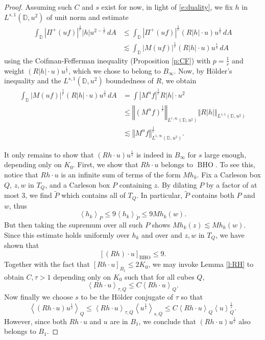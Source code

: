 \documentclass{amsart}
\newcommand{\abs}[1]{\left\vert {#1}\right\vert}
\newcommand{\norm}[1]{\left\Vert {#1}\right\Vert}
\newcommand{\avg}[1]{\left\langle {#1}\right\rangle}
\theoremstyle{definition}
\numberwithin{equation}{section}
\DeclareMathOperator{\BHO}{BHO}
\begin{document}
\begin{proof}
Assuming such $C$ and $s$ exist for now, in light of \eqref{e:duality}, we fix $h$ in $L^{s,1}(\mathbb{D},u^2)$ of unit norm and estimate
    \[ \begin{aligned} \int_{\mathbb{D}} \abs{\Pi^+ (uf)}^{\frac 1r} \abs{h} u^{2- \frac 1r} \, dA &\le \int_{\mathbb{D}} \abs{\Pi^+ (uf)}^{\frac 1r} (R\abs{h} \cdot u) u^{\frac 1s} \, dA \\
    &\lesssim \int_{\mathbb{D}} \abs{M (uf)}^{\frac 1r} (R\abs{h} \cdot u)u^{\frac 1s} \, dA \end{aligned} \]
using the Coifman-Fefferman inequality (Proposition \ref{p:CF}) with $p= \frac 1r$ and weight $(R\abs{h} \cdot u) u^{\frac 1s}$, which we chose to belong to $B_\infty$. Now, by H\"older's inequality and the $L^{s,1}(\mathbb{D},u^2)$ boundedness of $R$, we obtain
    \[\begin{aligned} \int_{\mathbb{D}} \abs{M(u f)}^{\frac 1r} (R\abs{h} \cdot u) u^{\frac 1s} \, dA &= \int \abs{M^u f}^{\frac 1r} R\abs{h} \cdot u^2 \\
        &\le \norm{\left(M^u f\right)^{\frac 1r}}_{L^{r,\infty}(\mathbb{D},u^2)} \norm{R \abs h}_{L^{s,1}(\mathbb{D},u^2)} \\
        &\lesssim \norm{M^u f}_{L^{1,\infty}(\mathbb{D},u^2)}^{\frac 1r}.  \end{aligned} \]


It only remains to show that $(Rh \cdot u)u^{\frac 1s}$ is indeed in $B_\infty$ for $s$ large enough, depending only on $K_0$. First, we show that $Rh \cdot u$ belongs to $\BHO$. 
To see this, notice that $Rh \cdot u$ is an infinite sum of terms of the form $Mh_k$. Fix a Carleson box $Q$, $z,w$ in $T_Q$, and a Carleson box $P$ containing $z$. By dilating $P$ by a factor of at most $3$, we find $\tilde P$ which contains all of $T_Q$. In particular, $\tilde P$ contains both $P$ and $w$, thus
    \[ \avg{ h_k }_{P} \le 9 \avg{h_k}_{\tilde P} \le  9 Mh_k(w).\]
But then taking the supremum over all such $P$ shows $Mh_k(z) \lesssim Mh_k(w)$. Since this estimate holds uniformly over $h_k$ and over and $z,w$ in $T_Q$, we have shown that	
	\[ [ (Rh) \cdot u] _{\BHO} \le 9.\] 
Together with the fact that $[Rh \cdot u]_{B_1} \le 2K_0$, we may invoke Lemma \ref{l:RH} to obtain $C,\tau>1$ depending only on $K_0$ such that for all cubes $Q$,
    \[ \avg{Rh \cdot u}_{\tau,Q} \le C \avg{Rh \cdot u}_Q.\]
Now finally we choose $s$ to be the H\"older conjugate of $\tau$ so that
    \[ \avg{(Rh \cdot u) u^{\frac 1s} }_{Q} \le \avg{Rh \cdot u }_{\tau, Q}\avg{ u^{\frac 1s} }_{s, Q} \le C \avg{ Rh \cdot u}_Q \avg{u}_Q^{\frac 1 {s}}.\]
However, since both $Rh \cdot u$ and $u$ are in $B_1$, we conclude that $(Rh \cdot u)u^{\frac 1s}$ also belongs to $B_1$.
\end{proof}
\end{document}
